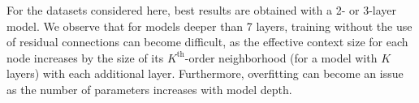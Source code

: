 \documentclass{article} %
\begin{document}
For the datasets considered here, best results are obtained with a 2- or 3-layer model. We observe that for models deeper than 7 layers, training without the use of residual connections can become difficult, as the effective context size for each node increases by the size of its $K^{\text{th}}$-order neighborhood (for a model with $K$ layers) with each additional layer. Furthermore, overfitting can become an issue as the number of parameters increases with model depth. %
\end{document}
